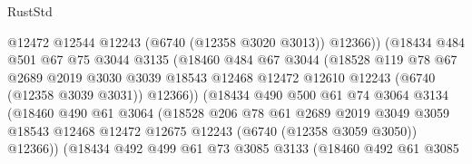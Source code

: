 \begin{lexlean}{RustStd}
\begin{coremodule}
                              @12472
                              @12544
                              @12243
                              (@6740 (@12358 @3020 @3013))
                              @12366))
                          (@18434
                            @484
                            @501
                            @67
                            @75
                            @3044
                            @3135
                            (@18460
                              @484
                              @67
                              @3044
                              (@18528
                                @119
                                @78
                                @67
                                @2689
                                @2019
                                @3030
                                @3039
                                @18543
                                @12468
                                @12472
                                @12610
                                @12243
                                (@6740 (@12358 @3039 @3031))
                                @12366))
                            (@18434
                              @490
                              @500
                              @61
                              @74
                              @3064
                              @3134
                              (@18460
                                @490
                                @61
                                @3064
                                (@18528
                                  @206
                                  @78
                                  @61
                                  @2689
                                  @2019
                                  @3049
                                  @3059
                                  @18543
                                  @12468
                                  @12472
                                  @12675
                                  @12243
                                  (@6740 (@12358 @3059 @3050))
                                  @12366))
                              (@18434
                                @492
                                @499
                                @61
                                @73
                                @3085
                                @3133
                                (@18460
                                  @492
                                  @61
                                  @3085

\end{coremodule}
\end{lexlean}
